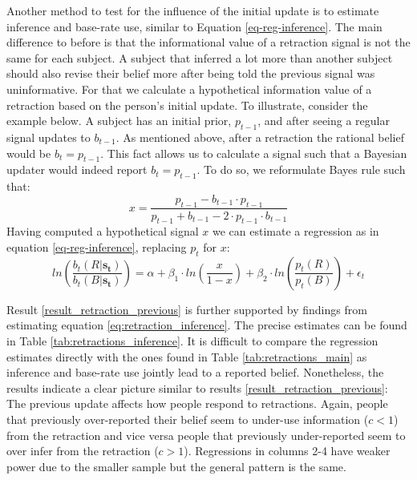 \documentclass{article}
\begin{document}
Another method to test for the influence of the initial update is to estimate inference and base-rate use, similar to Equation \ref{eq-reg-inference}. The main difference to before is that the informational value of a retraction signal is not the same for each subject. A subject that inferred a lot more than another subject should also revise their belief more after being told the previous signal was uninformative. For that we calculate a hypothetical information value of a retraction based on the person's initial update. To illustrate, consider the example below. A subject has an initial prior, $p_{t-1}$, and after seeing a regular signal updates to $b_{t-1}$. As mentioned above, after a retraction the rational belief would be $b_t=p_{t-1}$. This fact allows us to calculate a signal such that a Bayesian updater would indeed report $b_t=p_{t-1}$. To do so, we reformulate Bayes rule such that: 
\begin{equation*}
    x =  \frac{p_{t-1} - b_{t-1}\cdot p_{t-1}}{p_{t-1}+b_{t-1}-2\cdot p_{t-1}\cdot b_{t-1}}
\end{equation*}
Having computed a hypothetical signal $x$ we can estimate a regression as in equation \ref{eq-reg-inference}, replacing $p_t$ for $x$:
\begin{equation}
\label{eq:retraction_inference}
    ln(\frac{b_t(R|\mathbf{s_t})}{b_t(B|\mathbf{s_t})}) = \alpha + \beta_1 \cdot ln(\frac{x}{1-x}) + \beta_2 \cdot ln(\frac{p_t(R)}{p_t(B)}) + \epsilon_t
\end{equation}

Result \ref{result_retraction_previous} is further supported by findings from estimating equation \ref{eq:retraction_inference}. The precise estimates can be found in Table \ref{tab:retractions_inference}. It is difficult to compare the regression estimates directly with the ones found in Table \ref{tab:retractions_main} as inference and base-rate use jointly lead to a reported belief. Nonetheless, the results indicate a clear picture similar to results \ref{result_retraction_previous}: The previous update affects how people respond to retractions. Again, people that previously over-reported their belief seem to under-use information ($c<1$) from the retraction and vice versa people that previously under-reported seem to over infer from the retraction ($c>1$). Regressions in columns 2-4 have weaker power due to the smaller sample but the general pattern is the same.
\end{document}
